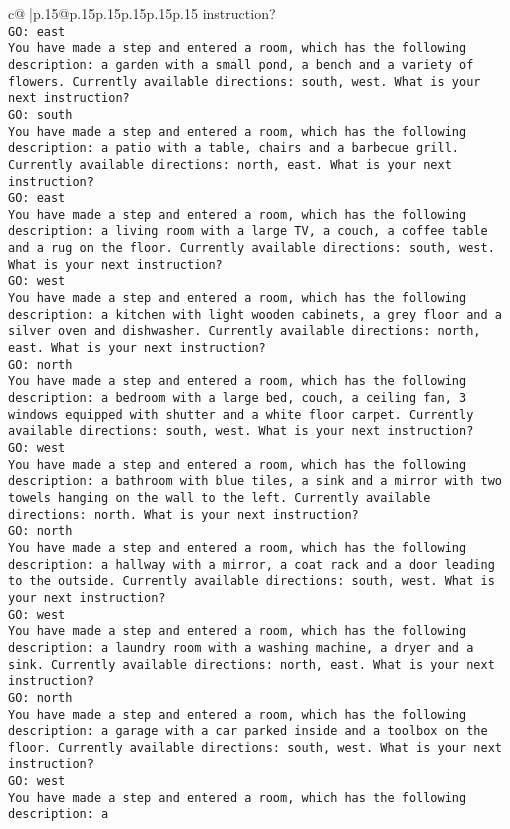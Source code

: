\documentclass{article}
\begin{document}
{\begin{supertabular}{c@{$\;$}|p{.15\linewidth}@{}p{.15\linewidth}p{.15\linewidth}p{.15\linewidth}p{.15\linewidth}p{.15\linewidth}}
{{{instruction?\\ \tt GO: east\\ \tt You have made a step and entered a room, which has the following description: a garden with a small pond, a bench and a variety of flowers. Currently available directions: south, west. What is your next instruction?\\ \tt GO: south\\ \tt You have made a step and entered a room, which has the following description: a patio with a table, chairs and a barbecue grill. Currently available directions: north, east. What is your next instruction?\\ \tt GO: east\\ \tt You have made a step and entered a room, which has the following description: a living room with a large TV, a couch, a coffee table and a rug on the floor. Currently available directions: south, west. What is your next instruction?\\ \tt GO: west\\ \tt You have made a step and entered a room, which has the following description: a kitchen with light wooden cabinets, a grey floor and a silver oven and dishwasher. Currently available directions: north, east. What is your next instruction?\\ \tt GO: north\\ \tt You have made a step and entered a room, which has the following description: a bedroom with a large bed, couch, a ceiling fan, 3 windows equipped with shutter and a white floor carpet. Currently available directions: south, west. What is your next instruction?\\ \tt GO: west\\ \tt You have made a step and entered a room, which has the following description: a bathroom with blue tiles, a sink and a mirror with two towels hanging on the wall to the left. Currently available directions: north. What is your next instruction?\\ \tt GO: north\\ \tt You have made a step and entered a room, which has the following description: a hallway with a mirror, a coat rack and a door leading to the outside. Currently available directions: south, west. What is your next instruction?\\ \tt GO: west\\ \tt You have made a step and entered a room, which has the following description: a laundry room with a washing machine, a dryer and a sink. Currently available directions: north, east. What is your next instruction?\\ \tt GO: north\\ \tt You have made a step and entered a room, which has the following description: a garage with a car parked inside and a toolbox on the floor. Currently available directions: south, west. What is your next instruction?\\ \tt GO: west\\ \tt You have made a step and entered a room, which has the following description: a }}}
\end{supertabular}}
\end{document}
